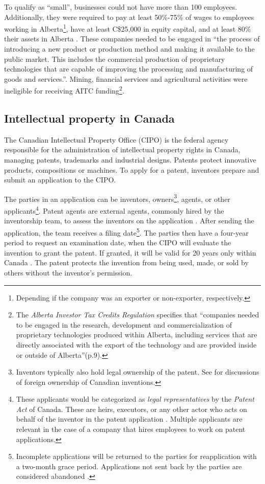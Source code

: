 \documentclass[../main.tex]{subfiles}
\begin{document}
To qualify as \enquote{small}, businesses could not have more than 100 employees. Additionally, they were required to pay at least 50\%-75\% of wages to employees working in Alberta\footnote{Depending if the company was an exporter or non-exporter, respectively.}, have at least C\$25,000 in equity capital, and at least 80\% their assets in Alberta \parencite{albertaeconomicdevelopmentandtrade19}. These companies needed to be engaged in \enquote{the process of introducing a new product or production method and making it available to the public market. This includes the commercial production of proprietary technologies that are capable of improving the processing and manufacturing of goods and services.}\parencite[p.19]{albertaeconomicdevelopmentandtrade19}. Mining, financial services and agricultural activities were ineligible for receiving AITC funding\footnote{The \textit{Alberta Investor Tax Credits Regulation}\nocite{Alberta19a} specifies that \enquote{companies needed to be engaged in the research, development and commercialization of proprietary technologies produced within Alberta, including services that are directly associated with the export of the technology and are provided inside or outside of Alberta}(p.9).}.

\subsection{Intellectual property in Canada}

The Canadian Intellectual Property Office (CIPO) is the federal agency responsible for the administration of intellectual property rights in Canada, managing patents, trademarks and industrial designs. Patents protect innovative products, compositions or machines. To apply for a patent, inventors prepare and submit an application to the CIPO. 

The parties in an application can be inventors, owners\footnote{Inventors typically also hold legal ownership of the patent. See \textcite{alam_etal22, beaudry_schiffauerova11} for discussions of foreign ownership of Canadian inventions.}, agents, or other applicants\footnote{These applicants would be categorized as \textit{legal representatives} by the \textit{Patent Act} of Canada. These are heirs, executors, or any other actor who acts on behalf of the inventor in the patent application \nocite{Patent85}. Multiple applicants are relevant in the case of a company that hires employees to work on patent applications.}. Patent agents are external agents, commonly hired by the inventorship team, to assess the inventors on the application \parencite{putnam06}. After sending the application, the team receives a filing date\footnote{Incomplete applications will be returned to the parties for reapplication with a two-month grace period. Applications not sent back by the parties are considered abandoned \parencite{canadianintellectualpropertyoffice21}.}. The parties then have a four-year period to request an examination date, when the CIPO will evaluate the invention to grant the patent. If granted, it will be valid for 20 years only within Canada \parencite{abbes_etal22}. The patent protects the invention from being used, made, or sold by others without the inventor's permission.
\end{document}
